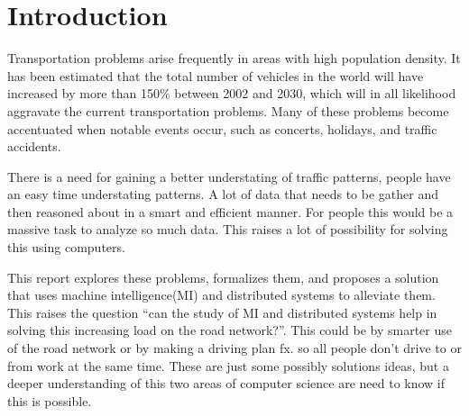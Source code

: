 \chapter*{Introduction}\label{chap:introduction}

Transportation problems arise frequently in areas with high population density. It has been estimated that the total number of vehicles in the world will have increased by more than 150\% between 2002 and 2030\cite{dargay2007vehicle}, which will in all likelihood aggravate the current transportation problems. Many of these problems become accentuated when notable events occur, such as concerts, holidays, and traffic accidents.

There is a need for gaining a better understating of traffic patterns, people have an easy time understating patterns. A lot of data that needs to be gather and then reasoned about in a smart and efficient manner. For people this would be a massive task to analyze so much data. This raises a lot of possibility for solving this using computers.

This report explores these problems, formalizes them, and proposes a solution that uses machine intelligence(MI) and distributed systems to alleviate them. This raises the question ``can the study of MI and distributed systems help in solving this increasing load on the road network?''. This could be by smarter use of the road network or by making a driving plan fx. so all people don't drive to or from work at the same time. These are just some possibly solutions ideas, but a deeper understanding of this two areas of computer science are need to know if this is possible.

